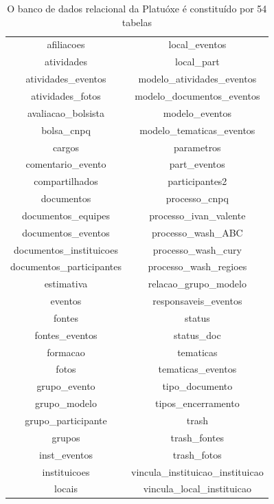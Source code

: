\documentclass[
12pt,		%
openright,	%
twoside,  %
a4paper,			%
chapter=TITLE,		%
english,			%
french,				%
spanish,			%
brazil				%
]{USPSC-classe/USPSC}
\begin{document}
\begin{table}[htb]
\tiny
\caption{\label{5b2e4ba8f3836249e7dd88b37344da7bfa3669c5}O banco de dados relacional da Platu\'oxe \'e constitu\'{i}do por 54 tabelas}

\centering
\begin{tabular}{|c|c|}
\hline
afiliacoes                     &   local\_eventos \\
 atividades                     &   local\_part \\
 atividades\_eventos             &   modelo\_atividades\_eventos \\
 atividades\_fotos               &   modelo\_documentos\_eventos \\
 avaliacao\_bolsista             &   modelo\_eventos \\
 bolsa\_cnpq                     &   modelo\_tematicas\_eventos \\
 cargos                         &   parametros \\
 comentario\_evento              &   part\_eventos \\
 compartilhados                 &   participantes2 \\
 documentos                     &   processo\_cnpq \\
 documentos\_equipes             &   processo\_ivan\_valente \\
 documentos\_eventos             &   processo\_wash\_ABC \\
 documentos\_instituicoes        &   processo\_wash\_cury \\
 documentos\_participantes       &   processo\_wash\_regioes \\
 estimativa                     &   relacao\_grupo\_modelo \\
 eventos                        &   responsaveis\_eventos \\
 fontes                         &   status \\
 fontes\_eventos                 &   status\_doc \\
 formacao                       &   tematicas \\
 fotos                          &   tematicas\_eventos \\
 grupo\_evento                   &   tipo\_documento \\
 grupo\_modelo                   &   tipos\_encerramento \\
 grupo\_participante             &   trash \\
 grupos                         &   trash\_fontes \\
 inst\_eventos                   &   trash\_fotos \\
 instituicoes                   &   vincula\_instituicao\_instituicao \\
 locais                         &   vincula\_local\_instituicao \\
\hline
\end{tabular}
\end{table}
\end{document}
